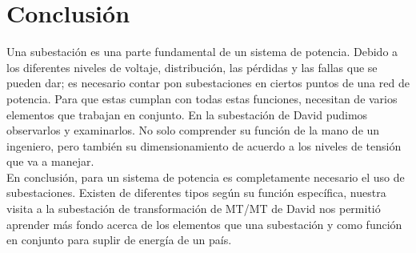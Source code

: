 \documentclass[11pt, Spanish]{article}
\begin{document}
\newpage

\section{Conclusión}


Una subestación es una parte fundamental de un sistema de potencia. Debido a los diferentes niveles de voltaje, distribución, las pérdidas y las fallas que se pueden dar; es necesario contar pon subestaciones en ciertos puntos de una red de potencia. Para que estas cumplan con todas estas funciones, necesitan de varios elementos que trabajan en conjunto. En la subestación de David pudimos observarlos y examinarlos. No solo comprender su función de la mano de un ingeniero, pero también su dimensionamiento de acuerdo a los niveles de tensión que va a manejar.  \\

En conclusión, para un sistema de potencia es completamente necesario el uso de subestaciones. Existen de diferentes tipos según su función específica, nuestra visita a la subestación de transformación de MT/MT de David nos permitió aprender más fondo acerca de los elementos que una subestación y como función en conjunto para suplir de energía de un país. 

\end{document}
